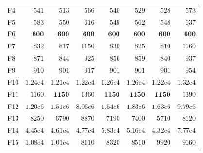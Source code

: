 \begin{tabular}{lrrrrrrr}
F4 & $541$ & $513$ & $566$ & $540$ & $529$ & $528$ & $573$ \\
F5 & $583$ & $550$ & $616$ & $549$ & $562$ & $548$ & $637$ \\
F6 & $\mathbf{600}$ & $\mathbf{600}$ & $\mathbf{600}$ & $\mathbf{600}$ & $\mathbf{600}$ & $\mathbf{600}$ & $\mathbf{600}$ \\
F7 & $832$ & $817$ & $1150$ & $830$ & $825$ & $810$ & $1160$ \\
F8 & $871$ & $844$ & $925$ & $856$ & $859$ & $840$ & $937$ \\
F9 & $910$ & $901$ & $917$ & $901$ & $901$ & $901$ & $954$ \\
F10 & $1.24\mathrm{e}{4}$ & $1.21\mathrm{e}{4}$ & $1.22\mathrm{e}{4}$ & $1.26\mathrm{e}{4}$ & $1.26\mathrm{e}{4}$ & $1.22\mathrm{e}{4}$ & $1.32\mathrm{e}{4}$ \\
F11 & $1160$ & $\mathbf{1150}$ & $1360$ & $\mathbf{1150}$ & $\mathbf{1150}$ & $\mathbf{1150}$ & $1390$ \\
F12 & $1.20\mathrm{e}{6}$ & $1.51\mathrm{e}{6}$ & $8.06\mathrm{e}{6}$ & $1.54\mathrm{e}{6}$ & $1.83\mathrm{e}{6}$ & $1.63\mathrm{e}{6}$ & $9.79\mathrm{e}{6}$ \\
F13 & $8250$ & $6790$ & $8870$ & $7190$ & $7400$ & $5710$ & $8120$ \\
F14 & $4.45\mathrm{e}{4}$ & $4.61\mathrm{e}{4}$ & $4.77\mathrm{e}{4}$ & $5.83\mathrm{e}{4}$ & $5.16\mathrm{e}{4}$ & $4.32\mathrm{e}{4}$ & $7.77\mathrm{e}{4}$ \\
F15 & $1.08\mathrm{e}{4}$ & $1.01\mathrm{e}{4}$ & $8110$ & $8320$ & $8510$ & $9920$ & $9160$ \\
\bottomrule
\end{tabular}
